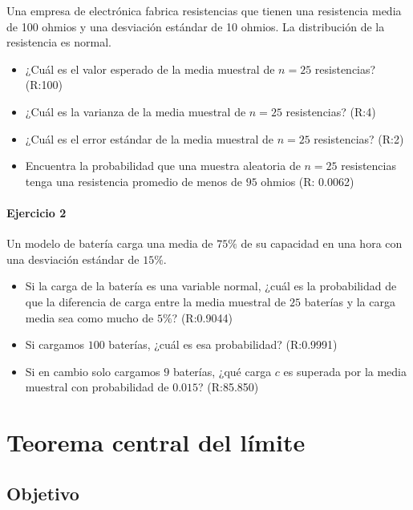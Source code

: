 \documentclass[
]{book}
\begin{document}
Una empresa de electrónica fabrica resistencias que tienen una resistencia media de 100 ohmios y
una desviación estándar de 10 ohmios. La distribución de la resistencia es normal.

\begin{itemize}
\item
  ¿Cuál es el valor esperado de la media muestral de \(n=25\) resistencias? (R:100)
\item
  ¿Cuál es la varianza de la media muestral de \(n=25\) resistencias? (R:4)
\item
  ¿Cuál es el error estándar de la media muestral de \(n=25\) resistencias? (R:2)
\item
  Encuentra la probabilidad
  que una muestra aleatoria de \(n = 25\) resistencias tenga una resistencia promedio de menos de \(95\) ohmios (R: 0.0062)
\end{itemize}

\hypertarget{ejercicio-2-7}{%
\subsubsection{Ejercicio 2}\label{ejercicio-2-7}}

Un modelo de batería carga una media de \(75\%\) de su capacidad en una hora con una desviación estándar de \(15\%\).

\begin{itemize}
\item
  Si la carga de la batería es una variable normal, ¿cuál es la probabilidad de que la diferencia de carga entre la media muestral de \(25\) baterías y la carga media sea como mucho de \(5\%\)? (R:0.9044)
\item
  Si cargamos \(100\) baterías, ¿cuál es esa probabilidad? (R:0.9991)
\item
  Si en cambio solo cargamos \(9\) baterías, ¿qué carga \(c\) es superada por la media muestral con probabilidad de \(0.015\)? (R:85.850)
\end{itemize}

\hypertarget{teorema-central-del-luxedmite}{%
\chapter{Teorema central del límite}\label{teorema-central-del-luxedmite}}

\hypertarget{objetivo-7}{%
\section{Objetivo}\label{objetivo-7}}
\end{document}
